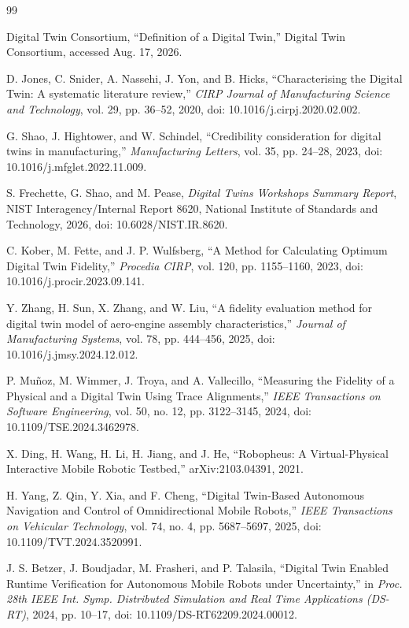 \documentclass[journal]{IEEEtran}
\begin{document}
\balance
\begin{thebibliography}{99}

Digital Twin Consortium, ``Definition of a Digital Twin,'' Digital Twin Consortium, accessed Aug. 17, 2026.

D. Jones, C. Snider, A. Nassehi, J. Yon, and B. Hicks, ``Characterising the Digital Twin: A systematic literature review,'' \emph{CIRP Journal of Manufacturing Science and Technology}, vol. 29, pp. 36--52, 2020, doi: 10.1016/j.cirpj.2020.02.002.

G. Shao, J. Hightower, and W. Schindel, ``Credibility consideration for digital twins in manufacturing,'' \emph{Manufacturing Letters}, vol. 35, pp. 24--28, 2023, doi: 10.1016/j.mfglet.2022.11.009.

S. Frechette, G. Shao, and M. Pease, \emph{Digital Twins Workshops Summary Report}, NIST Interagency/Internal Report 8620, National Institute of Standards and Technology, 2026, doi: 10.6028/NIST.IR.8620.

C. Kober, M. Fette, and J. P. Wulfsberg, ``A Method for Calculating Optimum Digital Twin Fidelity,'' \emph{Procedia CIRP}, vol. 120, pp. 1155--1160, 2023, doi: 10.1016/j.procir.2023.09.141.

Y. Zhang, H. Sun, X. Zhang, and W. Liu, ``A fidelity evaluation method for digital twin model of aero-engine assembly characteristics,'' \emph{Journal of Manufacturing Systems}, vol. 78, pp. 444--456, 2025, doi: 10.1016/j.jmsy.2024.12.012.

P. Mu\~noz, M. Wimmer, J. Troya, and A. Vallecillo, ``Measuring the Fidelity of a Physical and a Digital Twin Using Trace Alignments,'' \emph{IEEE Transactions on Software Engineering}, vol. 50, no. 12, pp. 3122--3145, 2024, doi: 10.1109/TSE.2024.3462978.

X. Ding, H. Wang, H. Li, H. Jiang, and J. He, ``Robopheus: A Virtual-Physical Interactive Mobile Robotic Testbed,'' arXiv:2103.04391, 2021.

H. Yang, Z. Qin, Y. Xia, and F. Cheng, ``Digital Twin-Based Autonomous Navigation and Control of Omnidirectional Mobile Robots,'' \emph{IEEE Transactions on Vehicular Technology}, vol. 74, no. 4, pp. 5687--5697, 2025, doi: 10.1109/TVT.2024.3520991.

J. S. Betzer, J. Boudjadar, M. Frasheri, and P. Talasila, ``Digital Twin Enabled Runtime Verification for Autonomous Mobile Robots under Uncertainty,'' in \emph{Proc. 28th IEEE Int. Symp. Distributed Simulation and Real Time Applications (DS-RT)}, 2024, pp. 10--17, doi: 10.1109/DS-RT62209.2024.00012.


\end{thebibliography}
\end{document}
